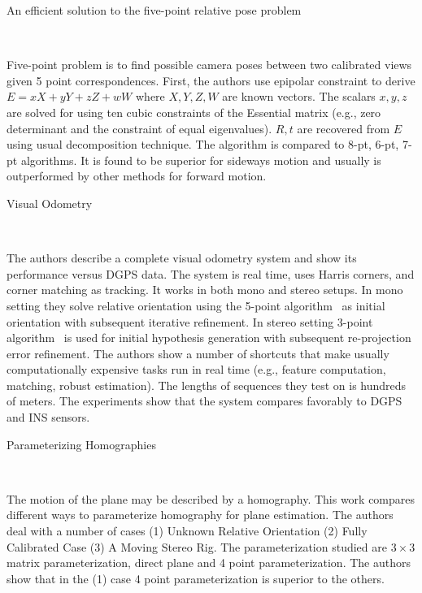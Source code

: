\documentclass[10pt]{article}         %
\begin{document}
\begin{enumerate}
  {\Large \item An efficient solution to the five-point relative pose
    problem}~\cite{nister2004efficient}

  Five-point problem is to find possible camera poses between two
  calibrated views given 5 point correspondences. First, the authors
  use epipolar constraint to derive $E = xX+yY+zZ+wW$ where $X,Y,Z,W$
  are known vectors.  The scalars $x,y,z$ are solved for using ten
  cubic constraints of the Essential matrix (e.g., zero determinant and
  the constraint of equal eigenvalues). $R,t$ are recovered from $E$
  using usual decomposition technique.  The algorithm is compared to
  8-pt, 6-pt, 7-pt algorithms.  It is found to be superior for
  sideways motion and usually is outperformed by other methods for
  forward motion.

  {\Large \item Visual Odometry}~\cite{nister2004visual}

  The authors describe a complete visual odometry system and show its
  performance versus DGPS data.  The system is real time, uses Harris
  corners, and corner matching as tracking.  It works in both mono and
  stereo setups. In mono setting they solve relative orientation using
  the 5-point algorithm~\cite{nister2004efficient} as initial
  orientation with subsequent iterative refinement. In stereo setting
  3-point algorithm~\cite{haralick1991analysis} is used for initial
  hypothesis generation with subsequent re-projection error
  refinement.  The authors show a number of shortcuts that make
  usually computationally expensive tasks run in real time
  (e.g., feature computation, matching, robust estimation).  The
  lengths of sequences they test on is hundreds of meters.  The
  experiments show that the system compares favorably to DGPS and INS
  sensors.

  {\Large \item Parameterizing
    Homographies}~\cite{baker2006parameterizing}

  The motion of the plane may be described by a homography.  This work
  compares different ways to parameterize homography for plane
  estimation.  The authors deal with a number of cases (1) Unknown
  Relative Orientation (2) Fully Calibrated Case (3) A Moving Stereo
  Rig.  The parameterization studied are $3\times 3$ matrix
  parameterization, direct plane and 4 point parameterization.  The
  authors show that in the (1) case 4 point parameterization is
  superior to the others.


\end{enumerate}
\end{document}
